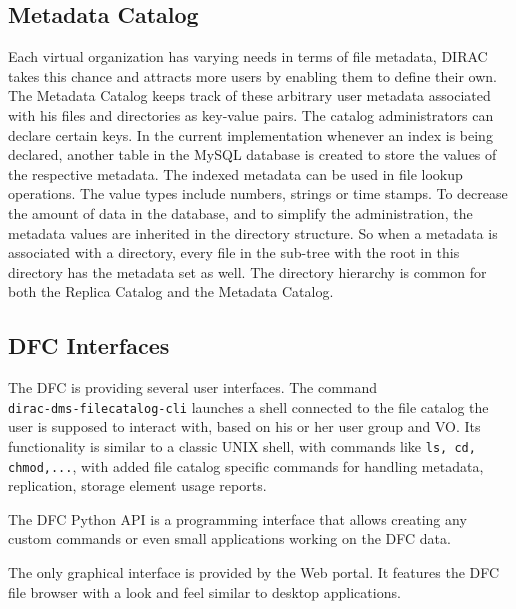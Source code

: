\subsection{Metadata Catalog}

Each virtual organization has varying needs in terms of file metadata, DIRAC takes this chance and 
attracts more users by enabling them to define their own. The Metadata Catalog keeps track of these 
arbitrary user metadata associated with his files and directories as key-value pairs. 
The catalog administrators can declare certain keys. In the current implementation whenever an 
index is being declared, another table in the MySQL database is created to store the values of the 
respective metadata. The indexed metadata can be used in file lookup operations. The value types include 
numbers, strings or time stamps. To decrease the amount of data in the database, and to simplify the 
administration, the metadata values are inherited in the directory structure. So when a metadata is 
associated with a directory, every file in the sub-tree with the root in this directory has the metadata
set as well. The directory hierarchy is common for both the Replica Catalog and the Metadata Catalog.

\subsection{DFC Interfaces}

The DFC is providing several user interfaces. The command \\ \texttt{dirac-dms-filecatalog-cli} launches a shell
connected to the file catalog the user is supposed to interact with, based on his or her user group and VO. Its 
functionality is similar to a classic UNIX shell, with commands like \texttt{ls, cd, chmod,...}, with added 
file catalog specific commands for handling metadata, replication, storage element usage reports.

The DFC Python API is a programming interface that allows creating any custom commands or even
small applications working on the DFC data.

The only graphical interface is provided by the Web portal. It features the DFC file browser
with a look and feel similar to desktop applications. %
